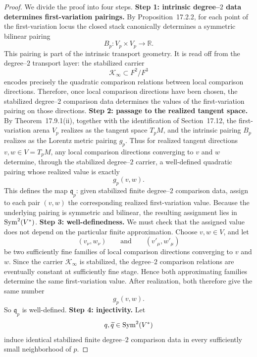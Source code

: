 \begin{proof}
	We divide the proof into four steps.
	\medskip
	\noindent
	\textbf{Step 1: intrinsic degree--\(2\) data determines first-variation
		pairings.}
	By Proposition~17.2.2, for each point of the first-variation locus the
	closed stack canonically determines a symmetric bilinear pairing
	\[
		B_p:V_p\times V_p\to\mathbb R.
	\]
	This pairing is part of the intrinsic transport geometry.
	It is read off from the degree--\(2\) transport layer: the stabilized
	carrier
	\[
		\mathcal K_\infty\subset F^2/F^3
	\]
	encodes precisely the quadratic comparison relations between local
	comparison directions.
	Therefore, once local comparison directions have been chosen, the
	stabilized degree--\(2\) comparison data determines the values of the
	first-variation pairing on those directions.
	\medskip
	\noindent
	\textbf{Step 2: passage to the realized tangent space.}
	By Theorem~17.9.1(ii), together with the identification of
	Section~17.12, the first-variation arena \(V_p\) realizes as the tangent
	space \(T_pM\), and the intrinsic pairing \(B_p\) realizes as the
	Lorentz metric pairing \(g_p\).
	Thus for realized tangent directions \(v,w\in V=T_pM\), any local
	comparison directions converging to \(v\) and \(w\) determine, through
	the stabilized degree--\(2\) carrier, a well-defined quadratic pairing
	whose realized value is exactly
	\[
		g_p(v,w).
	\]
	This defines the map \(\mathfrak q_p\): given stabilized finite
	degree--\(2\) comparison data, assign to each pair \((v,w)\) the
	corresponding realized first-variation value.
	Because the underlying pairing is symmetric and bilinear, the resulting
	assignment lies in \(\operatorname{Sym}^2(V^*)\).
	\medskip
	\noindent
	\textbf{Step 3: well-definedness.}
	We must check that the assigned value does not depend on the particular
	finite approximation.
	Choose \(v,w\in V\), and let
	\[
		(v_\nu,w_\nu)
		\qquad\text{and}\qquad
		(v'_\mu,w'_\mu)
	\]
	be two sufficiently fine families of local comparison directions
	converging to \(v\) and \(w\).
	Since the carrier \(\mathcal K_\infty\) is stabilized, the degree--\(2\)
	comparison relations are eventually constant at sufficiently fine stage.
	Hence both approximating families determine the same first-variation
	value.
	After realization, both therefore give the same number
	\[
		g_p(v,w).
	\]
	So \(\mathfrak q_p\) is well-defined.
	\medskip
	\noindent
	\textbf{Step 4: injectivity.}
	Let
	\[
		q,\widetilde q\in\operatorname{Sym}^2(V^*)
	\]
	induce identical stabilized finite degree--\(2\) comparison data in every
	sufficiently small neighborhood of \(p\).

\end{proof}
